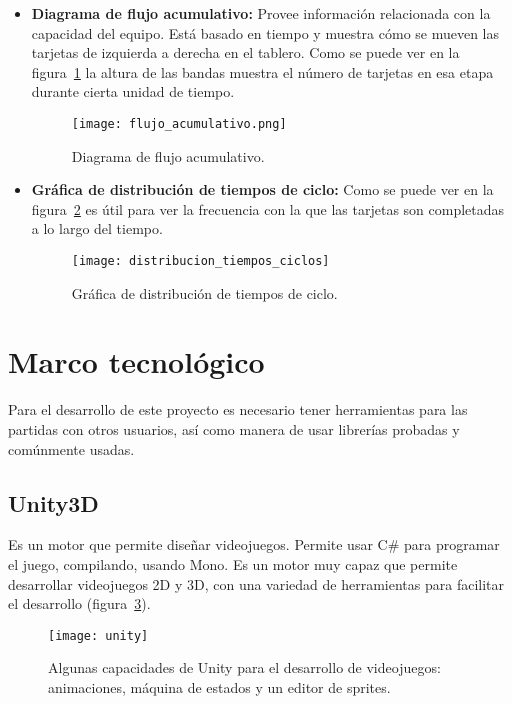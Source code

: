 \begin{itemize}
    \item \textbf{Diagrama de flujo acumulativo:} Provee información relacionada con la capacidad del equipo. Está basado en tiempo y muestra cómo se mueven las tarjetas de izquierda a derecha en el tablero. Como se puede ver en la figura~\ref{fig:flujo_acumulativo} la altura de las bandas muestra el número de tarjetas en esa etapa durante cierta unidad de tiempo.
    \begin{figure}[H]
        \centering
        \texttt{[image: flujo\_acumulativo.png]}
            \caption{Diagrama de flujo acumulativo.}
        \label{fig:flujo_acumulativo}
    \end{figure}
    \item \textbf{Gráfica de distribución de tiempos de ciclo:} Como se puede ver en la figura~\ref{fig:distribucion_tiempos_ciclos} es útil para ver la frecuencia con la que las tarjetas son completadas a lo largo del tiempo.
    \begin{figure}[H]
        \centering
        \texttt{[image: distribucion\_tiempos\_ciclos]}
        \caption{Gráfica de distribución de tiempos de ciclo.}
        \label{fig:distribucion_tiempos_ciclos}
    \end{figure}
\end{itemize}

\section{Marco tecnológico}
Para el desarrollo de este proyecto es necesario tener herramientas para las partidas con otros usuarios, así como manera de usar librerías probadas y comúnmente usadas.

\subsection{Unity3D}
Es un motor que permite diseñar videojuegos. Permite usar C\# para programar el juego, compilando, usando Mono\cite{unity2019}. Es un motor muy capaz que permite desarrollar videojuegos 2D y 3D, con una variedad de herramientas para facilitar el desarrollo (figura~\ref{fig:unity_screenshot}).

\begin{figure}[H]
    \centering
    \texttt{[image: unity]}
        \caption{Algunas capacidades de Unity para el desarrollo de videojuegos: animaciones, máquina de estados y un editor de sprites.}
        \label{fig:unity_screenshot}
\end{figure}

